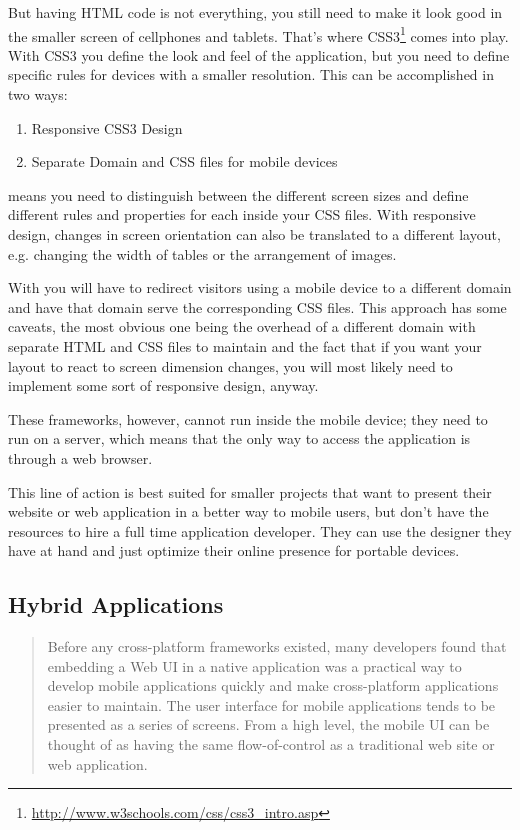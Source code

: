But having HTML code is not everything, you still need to make it look good in the smaller screen of cellphones and tablets. That's where CSS3\footnote{\url{http://www.w3schools.com/css/css3_intro.asp}} comes into play. With CSS3 you define the look and feel of the application, but you need to define specific rules for devices with a smaller resolution. This can be accomplished in two ways:
\begin{enumerate}
    \item Responsive CSS3 Design
    \item Separate Domain and CSS files for mobile devices
\end{enumerate}
 means you need to distinguish between the different screen sizes and define different rules and properties for each inside your CSS files. With responsive design, changes in screen orientation can also be translated to a different layout, e.g. changing the width of tables or the arrangement of images.


With  you will have to redirect visitors using a mobile device to a different domain and have that domain serve the corresponding CSS files. This approach has some caveats, the most obvious one being the overhead of a different domain with separate HTML and CSS files to maintain and the fact that if you want your layout to react to screen dimension changes, you will most likely need to implement some sort of responsive design, anyway.   
 

These frameworks, however, cannot run inside the mobile device; they need to run on a server, which means that the only way to access the application is through a web browser.


This line of action is best suited for smaller projects that want to present their website or web application in a better way to mobile users, but don't have the resources to hire a full time application developer. They can use the designer they have at hand and just optimize their online presence for portable devices.

\subsection{Hybrid Applications}\label{sec:hyb_app}
\begin{quotation}
Before any cross-platform frameworks existed, many developers found that embedding a Web \ac{UI} in a native application was a practical way to develop mobile applications quickly and make cross-platform applications easier to maintain. The user interface for mobile applications tends to be presented as a series of screens. From a high level, the mobile \ac{UI} can be thought of as having the same flow-of-control as a traditional web site or web application. \cite[p. 28]{allen:2010}
\end{quotation}

